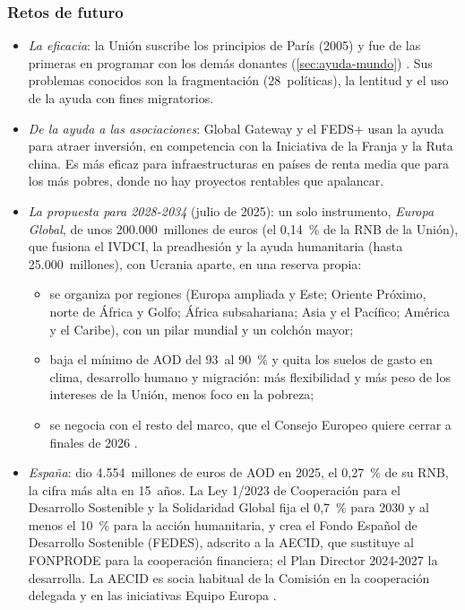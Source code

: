 \documentclass[11pt]{article}
\begin{document}
\subsubsection{Retos de futuro}\label{sec:retos-coop}

\begin{itemize}
\item \emph{La eficacia}: la Unión suscribe los principios de París (2005) y fue de las primeras en programar con los demás donantes (\ref{sec:ayuda-mundo}) . Sus problemas conocidos son la fragmentación (28~políticas), la lentitud y el uso de la ayuda con fines migratorios.
\item \emph{De la ayuda a las asociaciones}: Global Gateway y el FEDS+ usan la ayuda para atraer inversión, en competencia con la Iniciativa de la Franja y la Ruta china. Es más eficaz para infraestructuras en países de renta media que para los más pobres, donde no hay proyectos rentables que apalancar.
\item \emph{La propuesta para 2028-2034} (julio de 2025): un solo instrumento, \emph{Europa Global}, de unos 200.000~millones de euros (el 0,14~\% de la RNB de la Unión), que fusiona el IVDCI, la preadhesión y la ayuda humanitaria (hasta 25.000~millones), con Ucrania aparte, en una reserva propia\nocite{CE2025EuropaGlobal}:
  \begin{itemize}
  \item se organiza por regiones (Europa ampliada y Este; Oriente Próximo, norte de África y Golfo; África subsahariana; Asia y el Pacífico; América y el Caribe), con un pilar mundial y un colchón mayor;
  \item baja el mínimo de AOD del 93~al 90~\% y quita los suelos de gasto en clima, desarrollo humano y migración: más flexibilidad y más peso de los intereses de la Unión, menos foco en la pobreza\nocite{Bruegel2026EuropaGlobal};
  \item se negocia con el resto del marco, que el Consejo Europeo quiere cerrar a finales de 2026 .
  \end{itemize}
\item \emph{España}: dio 4.554~millones de euros de AOD en 2025, el 0,27~\% de su RNB, la cifra más alta en 15~años\nocite{Exteriores2026AOD}. La Ley 1/2023 de Cooperación para el Desarrollo Sostenible y la Solidaridad Global fija el 0,7~\% para 2030 y al menos el 10~\% para la acción humanitaria, y crea el Fondo Español de Desarrollo Sostenible (FEDES), adscrito a la AECID, que sustituye al FONPRODE para la cooperación financiera\nocite{BOE2023LeyCooperacion}; el Plan Director 2024-2027 la desarrolla. La AECID es socia habitual de la Comisión en la cooperación delegada y en las iniciativas Equipo Europa .
\end{itemize}
\end{document}
